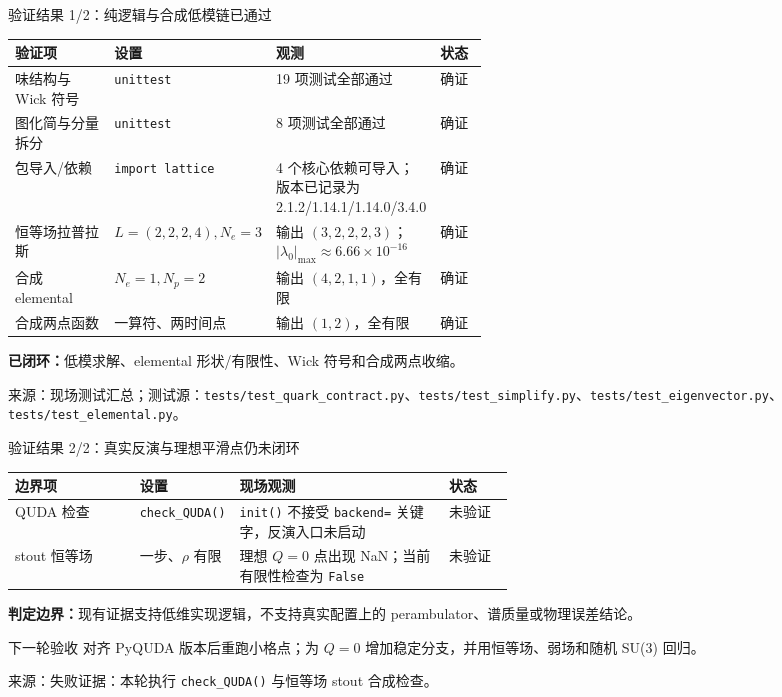 \documentclass[UTF8,aspectratio=169,11pt]{ctexbeamer}
\newcommand{\source}[1]{%
  \vspace{0.06em}\par{\raggedright\scriptsize\color{muted}来源：#1\par}}
\newcommand{\verified}{\textcolor{evidence}{确证}}
\newcommand{\unverified}{\textcolor{warning}{未验证}}
\newcommand{\codepath}[1]{\nolinkurl{#1}}
\begin{document}
\begin{frame}[t]{验证结果 1/2：纯逻辑与合成低模链已通过}
  \centering
  \small
  \begin{tabularx}{0.96\linewidth}{@{}L{0.25\linewidth}L{0.17\linewidth}Y L{0.13\linewidth}@{}}
    \toprule
    验证项 & 设置 & 观测 & 状态 \\
    \midrule
    味结构与 Wick 符号 & \texttt{unittest} & 19 项测试全部通过 & \verified \\
    图化简与分量拆分 & \texttt{unittest} & 8 项测试全部通过 & \verified \\
    包导入/依赖 & \texttt{import lattice} & 4 个核心依赖可导入；版本已记录为 2.1.2/1.14.1/1.14.0/3.4.0 & \verified \\
    恒等场拉普拉斯 & $L=(2,2,2,4),N_e=3$ & 输出 $(3,2,2,2,3)$；$|\lambda_0|_{\max}\approx6.66\times10^{-16}$ & \verified \\
    合成 elemental & $N_e=1,N_p=2$ & 输出 $(4,2,1,1)$，全有限 & \verified \\
    合成两点函数 & 一算符、两时间点 & 输出 $(1,2)$，全有限 & \verified \\
    \bottomrule
  \end{tabularx}
  \vspace{0.16cm}
  \begin{center}
    \colorbox{good}{\parbox{0.88\linewidth}{\centering
      \textbf{已闭环：}低模求解、elemental 形状/有限性、Wick 符号和合成两点收缩。}}
  \end{center}
  \source{现场测试汇总；测试源：\codepath{tests/test_quark_contract.py}、\codepath{tests/test_simplify.py}、\codepath{tests/test_eigenvector.py}、\codepath{tests/test_elemental.py}。}
\end{frame}

\begin{frame}[t]{验证结果 2/2：真实反演与理想平滑点仍未闭环}
  \centering
  \small
  \begin{tabularx}{0.96\linewidth}{@{}L{0.25\linewidth}L{0.20\linewidth}Y L{0.13\linewidth}@{}}
    \toprule
    边界项 & 设置 & 现场观测 & 状态 \\
    \midrule
    QUDA 检查 & \texttt{check\_QUDA()} & \texttt{init()} 不接受 \texttt{backend=} 关键字，反演入口未启动 & \unverified \\
    stout 恒等场 & 一步、$\rho$ 有限 & 理想 $Q=0$ 点出现 NaN；当前有限性检查为 \texttt{False} & \unverified \\
    \bottomrule
  \end{tabularx}
  \vspace{0.2cm}
  \begin{center}
    \colorbox{warnbg}{\parbox{0.88\linewidth}{\centering
      \textbf{判定边界：}现有证据支持低维实现逻辑，不支持真实配置上的 perambulator、谱质量或物理误差结论。}}
  \end{center}
  \vspace{0.08cm}
  \begin{block}{下一轮验收}
    \small
    对齐 PyQUDA 版本后重跑小格点；为 $Q=0$ 增加稳定分支，并用恒等场、弱场和随机 SU(3) 回归。
  \end{block}
  \source{失败证据：本轮执行 \texttt{check\_QUDA()} 与恒等场 stout 合成检查。}
\end{frame}
\end{document}
